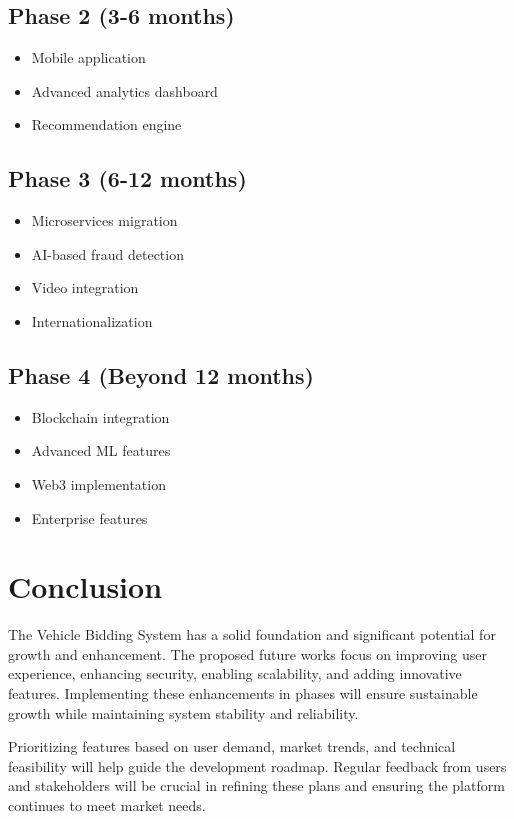 \subsection{Phase 2 (3-6 months)}
\begin{itemize}
    \item Mobile application
    \item Advanced analytics dashboard
    \item Recommendation engine
\end{itemize}

\subsection{Phase 3 (6-12 months)}
\begin{itemize}
    \item Microservices migration
    \item AI-based fraud detection
    \item Video integration
    \item Internationalization
\end{itemize}

\subsection{Phase 4 (Beyond 12 months)}
\begin{itemize}
    \item Blockchain integration
    \item Advanced ML features
    \item Web3 implementation
    \item Enterprise features
\end{itemize}

\section{Conclusion}

The Vehicle Bidding System has a solid foundation and significant potential for growth and enhancement. The proposed future works focus on improving user experience, enhancing security, enabling scalability, and adding innovative features. Implementing these enhancements in phases will ensure sustainable growth while maintaining system stability and reliability.

Prioritizing features based on user demand, market trends, and technical feasibility will help guide the development roadmap. Regular feedback from users and stakeholders will be crucial in refining these plans and ensuring the platform continues to meet market needs.

